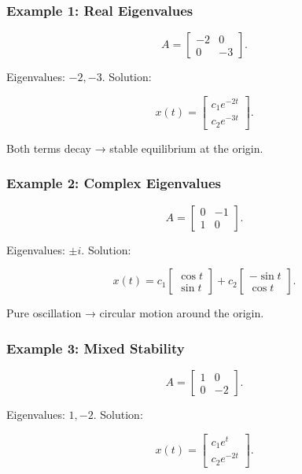 \documentclass[
  letterpaper,
  DIV=11,
  numbers=noendperiod]{scrreprt}
\begin{document}
\subsubsection{Example 1: Real
Eigenvalues}\label{example-1-real-eigenvalues}

\[
A = \begin{bmatrix} -2 & 0 \\ 0 & -3 \end{bmatrix}.
\]

Eigenvalues: \(-2, -3\). Solution:

\[
x(t) = \begin{bmatrix} c_1 e^{-2t} \\ c_2 e^{-3t} \end{bmatrix}.
\]

Both terms decay → stable equilibrium at the origin.

\subsubsection{Example 2: Complex
Eigenvalues}\label{example-2-complex-eigenvalues}

\[
A = \begin{bmatrix} 0 & -1 \\ 1 & 0 \end{bmatrix}.
\]

Eigenvalues: \(\pm i\). Solution:

\[
x(t) = c_1 \begin{bmatrix} \cos t \\ \sin t \end{bmatrix} + c_2 \begin{bmatrix} -\sin t \\ \cos t \end{bmatrix}.
\]

Pure oscillation → circular motion around the origin.

\subsubsection{Example 3: Mixed
Stability}\label{example-3-mixed-stability}

\[
A = \begin{bmatrix} 1 & 0 \\ 0 & -2 \end{bmatrix}.
\]

Eigenvalues: \(1, -2\). Solution:

\[
x(t) = \begin{bmatrix} c_1 e^t \\ c_2 e^{-2t} \end{bmatrix}.
\]
\end{document}
